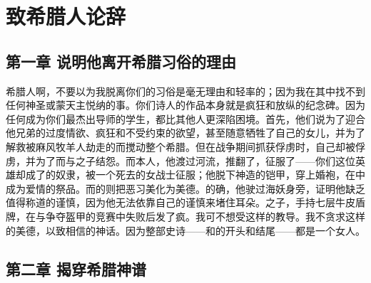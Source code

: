 
\chapter{致希腊人论辞}



\section{第一章 说明他离开希腊习俗的理由}

希腊人啊，不要以为我脱离你们的习俗是毫无理由和轻率的；因为我在其中找不到任何神圣或蒙天主悦纳的事。你们诗人的作品本身就是疯狂和放纵的纪念碑。因为任何成为你们最杰出导师的学生，都比其他人更深陷困境。首先，他们说为了迎合他兄弟的过度情欲、疯狂和不受约束的欲望，甚至随意牺牲了自己的女儿，并为了解救被麻风牧羊人劫走的而搅动整个希腊。但在战争期间抓获俘虏时，自己却被俘虏，并为了而与之子结怨。而本人，他渡过河流，推翻了，征服了——你们这位英雄却成了的奴隶，被一个死去的女战士征服；他脱下神造的铠甲，穿上婚袍，在中成为爱情的祭品。而的则把恶习美化为美德。的确，他驶过海妖身旁，证明他缺乏值得称道的谨慎，因为他无法依靠自己的谨慎来堵住耳朵。之子，手持七层牛皮盾牌，在与争夺盔甲的竞赛中失败后发了疯。我可不想受这样的教导。我不贪求这样的美德，以致相信的神话。因为整部史诗——和的开头和结尾——都是一个女人。\par


\section{第二章 揭穿希腊神谱}

